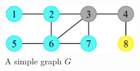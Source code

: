 {\begin{columns}
\begin{column}{0.5\textwidth}
\begin{center}
\begin{textblock*}{8cm}
          \begin{figure}
            \centering
            \includegraphics[width=5.7cm]{../figures/algorithm1-slide-25.pdf}
            \caption*{A simple graph $G$}
          \end{figure}
        \end{textblock*}
      \end{center}
    \end{column}
  \end{columns}
}


